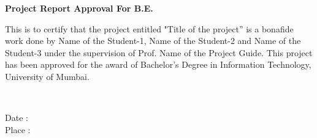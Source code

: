 
\newpage
\begin{center}
\textbf{\Large Project Report Approval For B.E.}
\end{center}
\vspace{0.5in}

This is to certify that the project entitled "Title of the project” is a bonafide work done by    Name of the Student-1, Name of the Student-2 and Name of the Student-3 under the supervision of Prof. Name of the Project Guide. This project has been approved for the award of Bachelor’s Degree in Information Technology, University of Mumbai.

\\\vspace{1in}
\begin{flushleft}
Date  :\\
Place :
\end{flushleft}

